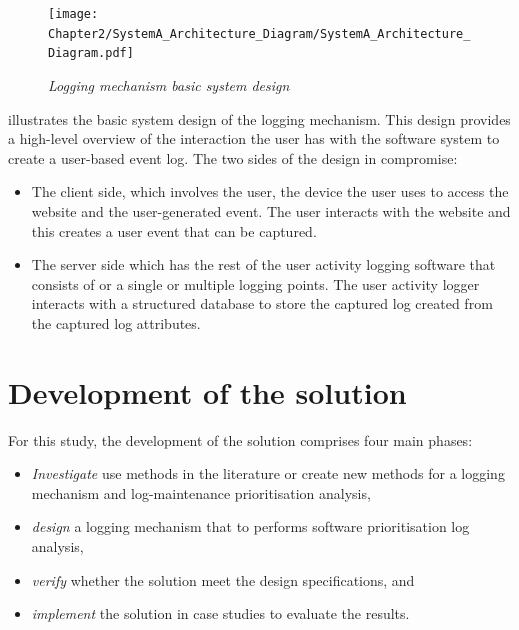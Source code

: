  \clearpage

 \begin{figure}[!htb]
	 \centering %
	 \texttt{[image: Chapter2/SystemA\_Architecture\_Diagram/SystemA\_Architecture\_Diagram.pdf]}
	 \caption[Logging mechanism basic system design]
	 {\textit{Logging mechanism basic system design}}\label{fig:ch2_systemDesign}
 \end{figure}
 
 illustrates the basic system design of the logging mechanism. This design provides a high-level overview of the interaction the user has with the software system to create a user-based event log. The two sides of the design in  compromise:
 
 \begin{itemize}
	 \item The client side, which involves the user, the device the user uses to access the website and the user-generated event. The user interacts with the website and this creates a user event that can be captured. 
	 \item The server side which has the rest of the user activity logging software that consists of or a single or multiple logging points. The user activity logger interacts with a structured database to store the captured log created from the captured log attributes.
 \end{itemize}

 \clearpage

\section{Development of the solution}\label{sec:ch2_developementOfSolution}
For this study, the development of the solution comprises four main phases:

\begin{itemize}
	\item \textit{Investigate} use methods in the literature or create new methods for a logging mechanism and log-maintenance prioritisation analysis,
	\item \textit{design} a logging mechanism that to performs software prioritisation log analysis,
	\item \textit{verify} whether the solution meet the design specifications, and
	\item \textit{implement} the solution in case studies to evaluate the results.
\end{itemize}

